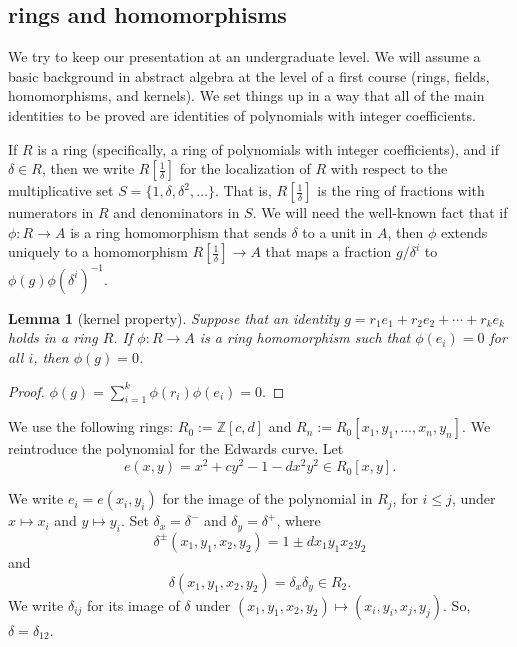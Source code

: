 \documentclass[12pt]{article}
\newtheorem{lemma}[theorem]{Lemma}
\newcommand{\ring}[1]{\mathbb{#1}}
\newcommand{\f}[1]{\frac{1}{#1}}
\begin{document}
\subsection{rings and homomorphisms}

We try to keep our presentation at an undergraduate level.  We will
assume a basic background in abstract algebra at the level of a first
course (rings, fields, homomorphisms, and kernels).  We set things up
in a way that all of the main identities to be proved are identities
of polynomials with integer coefficients.

If $R$ is a ring (specifically, a ring of polynomials with integer
coefficients), and if $\delta\in R$, then we write $R[\f{\delta}]$ for
the localization of $R$ with respect to the multiplicative set
$S=\{1,\delta,\delta^2,\ldots\}$.  That is, $R[\f{\delta}]$ is the
ring of fractions with numerators in $R$ and denominators in $S$.  We
will need the well-known fact that if $\phi:R\to A$ is a ring
homomorphism that sends $\delta$ to a unit in $A$, then $\phi$ extends
uniquely to a homomorphism $R[\f{\delta}]\to A$ that maps a fraction
$g/\delta^i$ to $\phi(g)\phi(\delta^i)^{-1}$.

\begin{lemma}[kernel property] Suppose that an identity $g = r_1 e_1 +
  r_2 e_2 +\cdots + r_k e_k$ holds in a ring $R$.  If $\phi:R\to A$ is
  a ring homomorphism such that $\phi(e_i) =0$ for all $i$, then
  $\phi(g)=0$.
\end{lemma}

\begin{proof}
$\phi(g) = \sum_{i=1}^k \phi(r_i) \phi(e_i) = 0.$
\end{proof}

We use the following rings: $R_0 := \ring{Z}[c,d]$ and $R_n :=
R_0[x_1,y_1,\ldots,x_n,y_n]$.  We reintroduce the polynomial for the
Edwards curve.  Let
\begin{equation}
e(x,y) = x^2 + c y^2 -1 - d x^2 y^2 \in  R_0[x,y].
\end{equation}



We write $e_i = e(x_i,y_i)$ for the image of the polynomial in $R_j$,
for $i\le j$, under $x\mapsto x_i$ and $y\mapsto y_i$.  Set
$\delta_x = \delta^-$ and $\delta_y = \delta^+$, where
\[\delta^{\pm} (x_1,y_1,x_2,y_2) = 1\pm d x_1 y_1 x_2 y_2\] and
\[
\delta(x_1,y_1,x_2,y_2) = \delta_x\delta_y\in R_2.
\]
We write $\delta_{ij}$ for its image of $\delta$ under
$(x_1,y_1,x_2,y_2)\mapsto (x_i,y_i,x_j,y_j)$.  So,
$\delta=\delta_{12}$.
\end{document}
